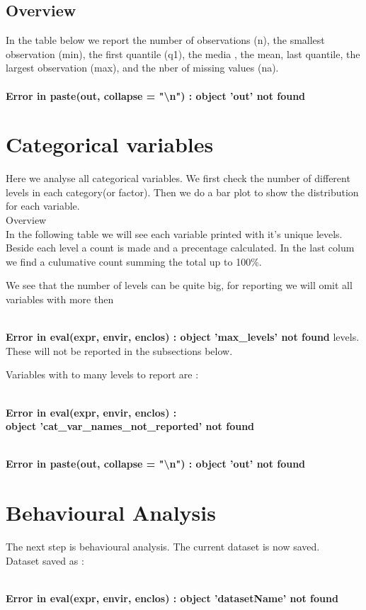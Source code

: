 \documentclass[10pt,a4paper,titlepage]{report}\usepackage{graphicx, color}
\begin{document}
\subsection{Overview}
In the table below we report the number of observations (n), the smallest observation (min),  the first quantile (q1), the media ,  the mean, last quantile, the largest observation (max), and the nber of missing values (na).\\




 





{\ttfamily\noindent\bfseries\textcolor{errorcolor}{\\Error in paste(out, collapse = "\textbackslash{}n") : object 'out' not found}}

\newpage
\section{Categorical variables}
Here we analyse all categorical variables. We first check the number of different levels in each category(or factor). Then we do a bar plot to show the distribution for each variable.
\\
Overview\\
In the following table we will see each variable printed with it's unique levels. Beside each level a count is made and a precentage calculated. In the last colum we find a culumative count summing the total up to 100\%. 


We see that the number of levels can be quite big, for reporting we will omit all variables with more then  

{\ttfamily\noindent\bfseries\textcolor{errorcolor}{\\Error in eval(expr, envir, enclos) : object 'max\_levels' not found}} levels. These will not be reported in the subsections below.



Variables with to many levels to report are : 

{\ttfamily\noindent\bfseries\textcolor{errorcolor}{\\Error in eval(expr, envir, enclos) : \\  object 'cat\_var\_names\_not\_reported' not found}}






{\ttfamily\noindent\bfseries\textcolor{errorcolor}{\\Error in paste(out, collapse = "\textbackslash{}n") : object 'out' not found}}

\section{Behavioural Analysis}
The next step is behavioural analysis.
The current dataset is now saved.\\



Dataset saved as : 

{\ttfamily\noindent\bfseries\textcolor{errorcolor}{\\Error in eval(expr, envir, enclos) : object 'datasetName' not found}}
\end{document}
